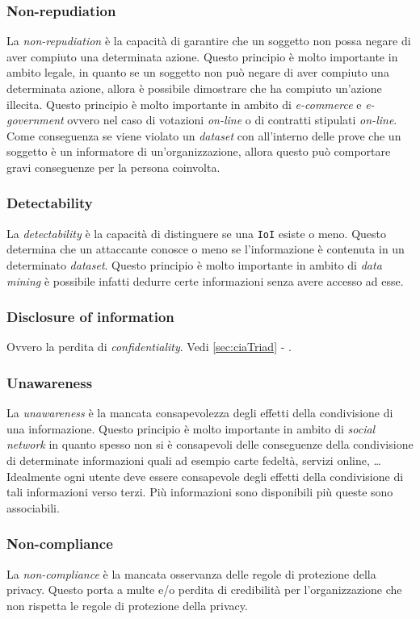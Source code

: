         \subsubsection{Non-repudiation}
            La \textit{non-repudiation} è la capacità di garantire che un soggetto non possa negare di aver compiuto una determinata azione. Questo principio è molto importante in ambito legale, in quanto se un soggetto non può negare di aver compiuto una determinata azione, allora è possibile dimostrare che ha compiuto un'azione illecita. Questo principio è molto importante in ambito di \textit{e-commerce} e \textit{e-government} ovvero nel caso di votazioni \textit{on-line} o di contratti stipulati \textit{on-line}. Come conseguenza se viene violato un \textit{dataset} con all'interno delle prove che un soggetto è un informatore di un'organizzazione, allora questo può comportare gravi conseguenze per la persona coinvolta.
        \subsubsection{Detectability}
            La \textit{detectability} è la capacità di distinguere se una \texttt{IoI} esiste o meno. Questo determina che un attaccante conosce o meno se l'informazione è contenuta in un determinato \textit{dataset}. Questo principio è molto importante in ambito di \textit{data mining} è possibile infatti dedurre certe informazioni senza avere accesso ad esse.
        \subsubsection{Disclosure of information}
            Ovvero la perdita di \textit{confidentiality}. Vedi \ref{sec:ciaTriad} - .
        \subsubsection{Unawareness}
            La \textit{unawareness} è la mancata consapevolezza degli effetti della condivisione di una informazione. Questo principio è molto importante in ambito di \textit{social network} in quanto spesso non si è consapevoli delle conseguenze della condivisione di determinate informazioni quali ad esempio carte fedeltà, servizi online, \dots\newline
            Idealmente ogni utente deve essere consapevole degli effetti della condivisione di tali informazioni verso terzi. Più informazioni sono disponibili più queste sono associabili.
        \subsubsection{Non-compliance}
            La \textit{non-compliance} è la mancata osservanza delle regole di protezione della privacy. Questo porta a multe e/o perdita di credibilità per l'organizzazione che non rispetta le regole di protezione della privacy.
        
